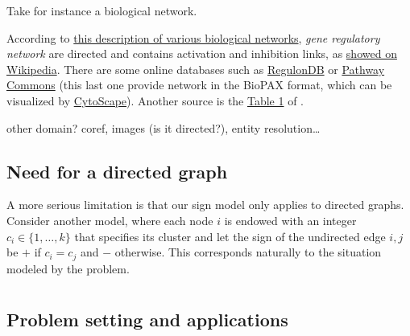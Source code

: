 \documentclass[nobib, a4paper, 10pt, oneside, onecolumn, openany, notitlepage, final,
svgnames, marginals=raggedouter, english,
]{article}
\begin{document}
Take for instance a biological network.

According to \href{https://web.stanford.edu/class/cs224w/slides/handout-bionets.pdf}%
{this description of various biological networks}, \emph{gene regulatory network} are directed and
contains activation and inhibition links, as \href{https://en.wikipedia.org/wiki/Gene_regulatory_network#Overview}%
{showed on Wikipedia}. There are some online databases such as
\href{http://regulondb.ccg.unam.mx/menu/download/datasets/index.jsp}%
{RegulonDB} or \href{http://www.pathwaycommons.org/pcviz/}{Pathway Commons} (this last one provide
network in the BioPAX format, which can be visualized by
\href{http://www.cytoscape.org/}{CytoScape}).
Another source is the \href{https://www.ncbi.nlm.nih.gov/pmc/articles/PMC2708159/table/T1}{Table 1}
of \cite{BioSigned09}.

other domain? coref, images (is it directed?), entity resolution…

\subsection{Need for a directed graph}
\label{sub:need_for_a_directed_graph}


A more serious limitation is that our sign model only applies to directed graphs. Consider
another model, where each node $i$ is endowed with an integer $c_i \in \{1, \ldots, k\}$ that
specifies its cluster and let the sign of the undirected edge $i,j$ be $+$ if $c_i = c_j$ and $-$
otherwise.  This corresponds naturally to the situation modeled by the \pcc{} problem.

\section{\pcc{}}
\label{sec:correlation_clustering}

\subsection{Problem setting and applications}
\label{sub:problem_setting}
\end{document}
